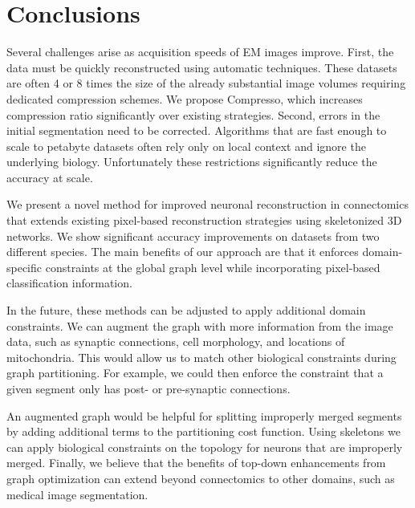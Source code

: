 \section{Conclusions}

Several challenges arise as acquisition speeds of EM images improve. 
First, the data must be quickly reconstructed using automatic techniques.
These datasets are often 4 or 8 times the size of the already substantial image volumes requiring dedicated compression schemes.
We propose Compresso, which increases compression ratio significantly over existing strategies.
Second, errors in the initial segmentation need to be corrected.
Algorithms that are fast enough to scale to petabyte datasets often rely only on local context and ignore the underlying biology.
Unfortunately these restrictions significantly reduce the accuracy at scale.

We present a novel method for improved neuronal reconstruction in connectomics that extends existing pixel-based reconstruction strategies using skeletonized 3D networks. 
We show significant accuracy improvements on datasets from two different species. 
The main benefits of our approach are that it enforces domain-specific constraints at the global graph level while incorporating pixel-based classification information.

In the future, these methods can be adjusted to apply additional domain constraints. 
We can augment the graph with more information from the image data, such as synaptic connections, cell morphology, and locations of mitochondria. 
This would allow us to match other biological constraints during graph partitioning. 
For example, we could then enforce the constraint that a given segment only has post- or pre-synaptic connections. 

An augmented graph would be helpful for splitting improperly merged segments by adding additional terms to the partitioning cost function. 
Using skeletons we can apply biological constraints on the topology for neurons that are improperly merged.
Finally, we believe that the benefits of top-down enhancements from graph optimization can extend beyond connectomics to other domains, such as medical image segmentation.